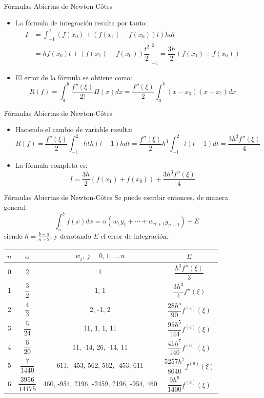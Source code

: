 \documentclass[12pt]{beamer}
\begin{document}
\begin{frame}{F\'ormulas Abiertas de Newton-C\^otes}
  \begin{itemize}
    \item La fórmula de integración resulta por tanto:
    \begin{align*}
      I  & = \int_{-1}^{2}\left(f(x_0)+\left(f(x_1)-f(x_0)\right)t\right)hdt\\
      & = h\left.f(x_0)t+\left(f(x_1)-f(x_0)\right)\dfrac{t^2}{2}\right|_{-1}^{2} = \dfrac{3h}{2}\left(f(x_1)+f(x_0)\right)
    \end{align*}
    \item<2-> El error de la fórmula se obtiene como:
    $$
    R(f) = \int_{a}^{b}\dfrac{f''(\xi)}{2!}\Pi(x)dx = \dfrac{f''(\xi)}{2}\int_{a}^{b}(x-x_0)(x-x_1)dx
    $$
  \end{itemize}
\end{frame}
\begin{frame}{F\'ormulas Abiertas de Newton-C\^otes}
  \begin{itemize}
    \item Haciendo el cambio de variable resulta:
    \small{
    $$
    R(f) = \dfrac{f''(\xi)}{2}\int_{-1}^{2}hth(t-1)hdt = \dfrac{f''(\xi)}{2}h^3\int_{-1}^{2}t(t-1)dt = \dfrac{3h^3f''(\xi)}{4}
    $$}
    \item La f\'ormula completa es:
    \small{
    $$
    I = \dfrac{3h}{2}\left(f(x_1)+f(x_0)\right)+ \dfrac{3h^3f''(\xi)}{4}
    $$}
  \end{itemize}  
\end{frame}
\begin{frame}{F\'ormulas Abiertas de Newton-C\^otes}
  Se puede escribir entonces, de manera general:
  \footnotesize{
$$
\int_a^bf(x)dx =\alpha(w_1y_1+\cdots+w_{n+1}y_{n+1})+E
$$}\normalsize
siendo $h=\frac{b-a}{n+2}$, y denotando $E$ el error de integraci\'on.
  \tiny{
    \begin{center}
      \begin{tabular}{@{} |c| c| c| c| @{}} 
        \toprule
        $n$ & $\alpha$ & $w_j,\ j=0,1,\ldots,n$ & $E$ \\[-1pt] 
        \midrule
        0 & 2 & 1 & $\dfrac{h^3f''(\xi)}{3}$ \\[-1pt]
        \midrule
        1 & $\dfrac{3}{2}$ & 1, 1 & $\dfrac{3h^3}{4}f''(\xi)$ \\[-1pt]
        \midrule
        2 & $\dfrac{4}{3}$ & 2, -1, 2 & $\dfrac{28h^5}{90}f^{(4)}(\xi)$ \\[-1pt]
        \midrule
        3 & $\dfrac{5}{24}$ & 11, 1, 1, 11 & $\dfrac{95h^5}{144}f^{(4)}(\xi)$ \\[-1pt]
        \midrule
        4 & $\dfrac{6}{20}$ & 11, -14, 26, -14, 11 & $\dfrac{41h^7}{140}f^{(6)}(\xi)$ \\[-1pt]
        \midrule
        5 & $\dfrac{7}{1440}$ & 611, -453, 562, 562, -453, 611 & $\dfrac{5257h^7}{8640}f^{(6)}(\xi)$ \\[-1pt]
        \midrule
        6 & $\dfrac{3956}{14175}$ & 460, -954, 2196, -2459, 2196, -954, 460 & $\dfrac{9h^9}{1400}f^{(8)}(\xi)$ \\
        \bottomrule
        \end{tabular}
\end{center}}
\end{frame}
\end{document}
